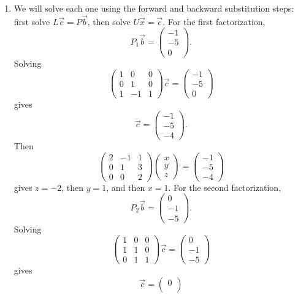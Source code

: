 \documentclass[10pt]{extarticle}
\begin{document}
\begin{enumerate}[label=(\alph*)]
\item We will solve each one using the forward and backward substitution steps: first solve $L\vec{c}=P\vec{b}$, then solve $U\vec{x}=\vec{c}$. For the first factorization,
\[
P_1\vec{b}=
\begin{pmatrix}
-1\\
-5\\
0
\end{pmatrix}.
\]
Solving
\[
\begin{pmatrix}
1 & 0 & 0\\
0 & 1 & 0\\
1 & -1 & 1
\end{pmatrix}
\vec{c}
=
\begin{pmatrix}
-1\\
-5\\
0
\end{pmatrix}
\]
gives
\[
\vec{c}=
\begin{pmatrix}
-1\\
-5\\
-4
\end{pmatrix}.
\]
Then
\[
\begin{pmatrix}
2 & -1 & 1\\
0 & 1 & 3\\
0 & 0 & 2
\end{pmatrix}
\begin{pmatrix}
x\\
y\\
z
\end{pmatrix}
=
\begin{pmatrix}
-1\\
-5\\
-4
\end{pmatrix}
\]
gives $z=-2$, then $y=1$, and then $x=1$. For the second factorization,
\[
P_2\vec{b}=
\begin{pmatrix}
0\\
-1\\
-5
\end{pmatrix}.
\]
Solving
\[
\begin{pmatrix}
1 & 0 & 0\\
1 & 1 & 0\\
0 & 1 & 1
\end{pmatrix}
\vec{c}
=
\begin{pmatrix}
0\\
-1\\
-5
\end{pmatrix}
\]
gives
\[
\vec{c}=
\begin{pmatrix}
0\\

\end{pmatrix}\]
\end{enumerate}
\end{document}
